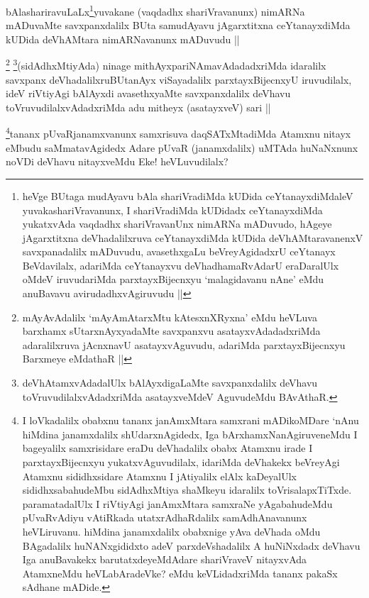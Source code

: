 \begin{artha}
bAlashariravuLaLx\footnote{heVge BUtaga mudAyavu bAla shariVradiMda kUDida ceYtanayxdiMdaleV yuvakashariVravanunx, I shariVradiMda kUDidadx ceYtanayxdiMda yukatxvAda vaqdadhx shariVravanUnx nimARNa mADuvudo, hAgeye jAgarxtitxna deVhadalilxruva ceYtanayxdiMda kUDida deVhAMtaravanenxV savxpanadalilx mADuvudu, avasethxgaLu beVreyAgidadxrU ceYtanayx BeVdavilalx, adariMda ceYtanayxvu deVhadhamaRvAdarU eraDaralUlx oMdeV iruvudariMda parxtayxBijecnxyu `malagidavanu nAne' eMdu anuBavavu avirudadhxvAgiruvudu ||}yuvakane (vaqdadhx shariVravanunx) nimARNa mADuvaMte savxpanxdalilx BUta samudAyavu jAgarxtitxna ceYtanayxdiMda kUDida deVhAMtara nimARNavanunx mADuvudu ||
\end{artha}

\begin{artha}
\footnote{mAyAvAdalilx `mAyAmAtarxMtu kAtesxnXRyxna' eMdu heVLuva barxhamx sUtarxnAyxyadaMte savxpanxvu asatayxvAdadadxriMda adaralilxruva jAcnxnavU asatayxvAguvudu, adariMda parxtayxBijecnxyu Barxmeye eMdathaR ||}
\footnote{deVhAtamxvAdadalUlx bAlAyxdigaLaMte savxpanxdalilx deVhavu toVruvudilalxvAdadxriMda asatayxveMdeV AguvudeMdu BAvAthaR.}(sidAdhxMtiyAda) ninage mithAyxpariNAmavAdadadxriMda idaralilx savxpanx deVhadalilxruBUtanAyx viSayadalilx parxtayxBijecnxyU iruvudilalx, ideV riVtiyAgi bAlAyxdi avasethxyaMte savxpanxdalilx deVhavu toVruvudilalxvAdadxriMda adu mitheyx (asatayxveV) sari || 
\end{artha}

\begin{artha}
\footnote[3]{I loVkadalilx obabxnu tananx janAmxMtara samxrani mADikoMDare `nAnu hiMdina janamxdalilx shUdarxnAgidedx, Iga bArxhamxNanAgiruveneMdu I bageyalilx samxrisidare eraDu deVhadalilx obabx Atamxnu irade I parxtayxBijecnxyu yukatxvAguvudilalx, idariMda deVhakekx beVreyAgi Atamxnu sididhxsidare Atamxnu I jAtiyalilx elAlx kaDeyalUlx sididhxsabahudeMbu sidAdhxMtiya shaMkeyu idaralilx toVrisalapxTiTxde. paramatadalUlx I riVtiyAgi janAmxMtara samxraNe yAgabahudeMdu pUvaRvAdiyu vAtiRkada utatxrAdhaRdalilx samAdhAnavanunx heVLiruvanu. hiMdina janamxdalilx obabxnige yAva deVhada oMdu BAgadalilx huNANxgididxto adeV parxdeVshadalilx A huNiNxdadx deVhavu Iga anuBavakekx barutatxdeyeMdAdare shariVraveV nitayxvAda AtamxneMdu heVLabAradeVke? eMdu keVLidadxriMda tananx pakaSx sAdhane mADide.}tananx pUvaRjanamxvanunx samxrisuva daqSATxMtadiMda Atamxnu nitayx eMbudu saMmatavAgidedx Adare pUvaR (janamxdalilx) uMTAda huNaNxnunx noVDi deVhavu nitayxveMdu Eke! heVLuvudilalx?
\end{artha}


